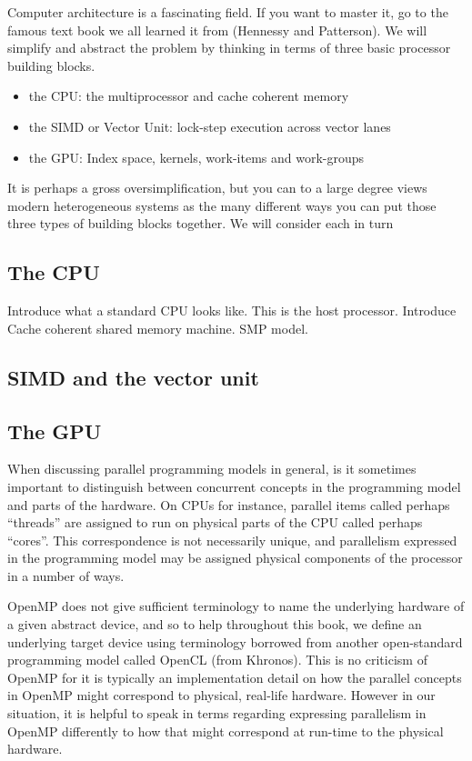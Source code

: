 Computer architecture is a fascinating field. If you want to master it, go to the
famous text book we all learned it from (Hennessy and Patterson).  We will simplify and
abstract the problem by thinking in terms of three basic processor building blocks.

\begin{itemize}
\item  the CPU: the multiprocessor and cache coherent memory
\item  the SIMD or Vector Unit: lock-step execution across vector lanes
\item  the GPU:  Index space, kernels, work-items and work-groups
\end{itemize}

It is perhaps a gross oversimplification, but you can to a large degree views modern heterogeneous systems
as the many different ways you can put those three types of building blocks together.  We will consider each 
in turn

\subsection{The CPU}

Introduce what a standard CPU looks like. This is the host processor.  Introduce Cache coherent shared memory machine. SMP model.

\subsection{SIMD and the vector unit}

\subsection{The GPU}
When discussing parallel programming models in general, is it sometimes important to distinguish between concurrent concepts in the programming model and parts of the hardware.
On CPUs for instance, parallel items called perhaps ``threads'' are assigned to run on physical parts of the CPU called perhaps ``cores''.
This correspondence is not necessarily unique, and parallelism expressed in the programming model may be assigned physical components of the processor in a number of ways.

OpenMP does not give sufficient terminology to name the underlying hardware of a given abstract device, and so to help throughout this book, we define an underlying target device using terminology borrowed from another open-standard programming model called OpenCL (from Khronos).
This is no criticism of OpenMP for it is typically an implementation detail on how the parallel concepts in OpenMP might correspond to physical, real-life hardware.
However in our situation, it is helpful to speak in terms regarding expressing parallelism in OpenMP differently to how that might correspond at run-time to the physical hardware.

